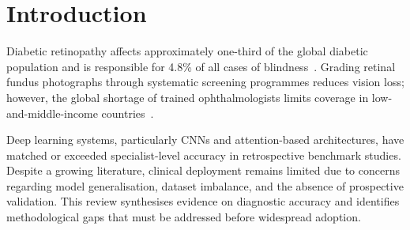 \section{Introduction}

Diabetic retinopathy affects approximately one-third of the global diabetic population
and is responsible for 4.8\% of all cases of blindness~\cite{Cheung2010}. Grading
retinal fundus photographs through systematic screening programmes reduces vision loss;
however, the global shortage of trained ophthalmologists limits coverage in
low-and-middle-income countries~\cite{WHO2019}.

Deep learning systems, particularly CNNs and attention-based architectures, have matched
or exceeded specialist-level accuracy in retrospective benchmark studies.
Despite a growing literature, clinical deployment remains limited due to concerns
regarding model generalisation, dataset imbalance, and the absence of prospective
validation. This review synthesises evidence on diagnostic accuracy and identifies
methodological gaps that must be addressed before widespread adoption.

